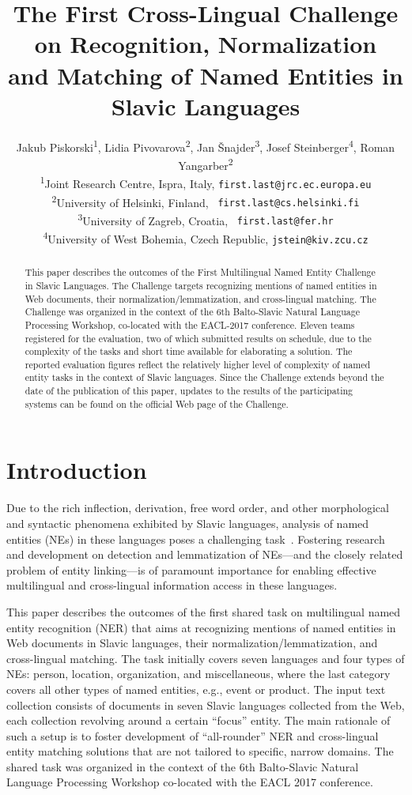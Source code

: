 \documentclass[11pt]{article}
\title{The First Cross-Lingual Challenge on Recognition,
  Normalization
  \\ and Matching of Named Entities in Slavic Languages}
\author{Jakub Piskorski\textsuperscript{1},
  Lidia Pivovarova\textsuperscript{2},
  Jan Šnajder\textsuperscript{3},
  Josef Steinberger\textsuperscript{4},
  Roman Yangarber\textsuperscript{2} \\
  \textsuperscript{1}Joint Research Centre,
  \comment{Via Enrico Fermi 2749, 21027}Ispra\comment{ (VA)}, Italy,
  {\small \tt first.last@jrc.ec.europa.eu} \\
  \textsuperscript{2}University of Helsinki, Finland, {\small \tt
  first.last@cs.helsinki.fi}\\
    \textsuperscript{3}University of Zagreb, Croatia, {\small \tt
    first.last@fer.hr} \\
  \textsuperscript{4}University of West Bohemia, Czech Republic, 
  {\small \tt jstein@kiv.zcu.cz} 
  }
\date{}
\begin{document}
\maketitle
\begin{abstract}

  This paper describes the outcomes of the First Multilingual Named Entity Challenge in Slavic
  Languages.  The Challenge targets recognizing mentions of named entities in Web documents,
  their normalization/lemmatization, and cross-lingual matching.  The Challenge was organized
  in the context of the 6th Balto-Slavic Natural Language Processing Workshop, co-located with
  the EACL-2017 conference.  Eleven teams registered for the evaluation, two of which
  submitted results on schedule, due to the complexity of the tasks and short time available
  for elaborating a solution.  The reported evaluation figures reflect the relatively higher
  level of complexity of named entity tasks in the context of Slavic languages.  Since the
  Challenge extends beyond the date of the publication of this paper, updates to the results
  of the participating systems can be found on the official Web page of the Challenge.

\end{abstract}

\section{Introduction}
\label{sec:intro}

Due to the rich inflection, derivation, free word order, and other morphological and syntactic
phenomena exhibited by Slavic languages, analysis of named entities (NEs) in these languages
poses a challenging
task~\cite{Przepiorkowski:2007:SIE:1567545.1567547,journals/ir/PiskorskiWS09}.  Fostering
research and development on detection and lemmatization of NEs---and the closely related
problem of entity linking---is of paramount importance for enabling effective multilingual and
cross-lingual information access in these languages.

This paper describes the outcomes of the first shared task on multilingual named entity
recognition {(NER)} that aims at recognizing mentions of named entities in Web documents in
Slavic languages, their normalization/lemmatization, and cross-lingual matching.  The task
initially covers seven languages and four types of NEs: person, location, organization, and
miscellaneous, where the last category covers all other types of named entities, e.g., event
or product.  The input text collection consists of documents in {seven Slavic languages}
collected from the Web, each collection revolving around a certain ``focus'' entity.  The main
rationale of such a setup is to foster development of ``all-rounder'' NER and cross-lingual
entity matching solutions that are not tailored to specific, narrow domains.  The shared task
was organized in the context of the 6th Balto-Slavic Natural Language Processing Workshop
co-located with the EACL 2017 conference.
\end{document}
